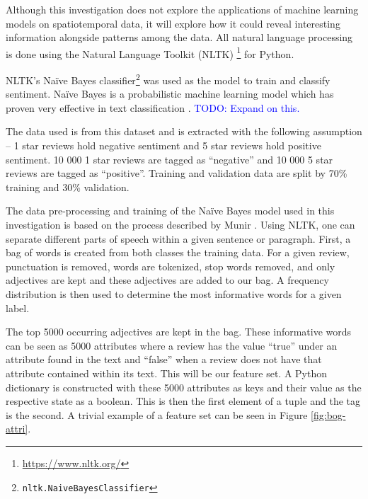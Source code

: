 Although this investigation does not explore the applications of machine learning models on
spatiotemporal data, it will explore how it could reveal interesting information alongside patterns
among the data. All natural language processing is done using the Natural Language Toolkit (NLTK)
\footnote{\url{https://www.nltk.org/}} for Python.

NLTK's Na\"ive Bayes classifier\footnote{\texttt{nltk.NaiveBayesClassifier}} was used as the model
to train and classify sentiment. Na\"ive Bayes is a probabilistic machine learning model which has
proven very effective in text classification \cite{rish2001empirical}. \textcolor{blue}{ TODO: Expand on this.}

The data used is from this dataset and is extracted with the following assumption -- 1 star reviews
hold negative sentiment and 5 star reviews hold positive sentiment. 10 000 1 star reviews are tagged
as ``negative'' and 10 000 5 star reviews are tagged as ``positive''. Training and validation data are
split by 70\% training and 30\% validation. 

The data pre-processing and training of the Na\"ive Bayes model used in this investigation is based on the process described by Munir \cite{SamiraMunir}. Using NLTK, one can separate different parts of speech within a given sentence or paragraph. First, a bag of words is created from both classes the training data. For a given review, punctuation is removed, words are tokenized, stop words removed, and only adjectives are kept and these adjectives are added to our bag. A frequency distribution is then used to determine the most informative words for a given label.

The top 5000 occurring adjectives are kept in the bag. These informative words can be seen as 5000 attributes where a review has the value ``true'' under an attribute found in the text and ``false'' when a review does not have that attribute contained within its text. This will be our feature set. A Python dictionary is constructed with these 5000 attributes as keys and their value as the respective state as a boolean. This is then the first element of a tuple and the tag is the second. A trivial example of a feature set can be seen in Figure \ref{fig:bog-attri}.

